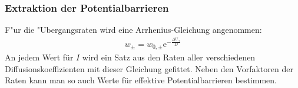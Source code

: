 \documentclass[12pt,a4paper]{article}
\begin{document}
\subsubsection{Extraktion der Potentialbarrieren}
F"ur die "Ubergangsraten wird eine Arrhenius-Gleichung angenommen:
\begin{align*}
w_{\pm}=w_{0,\pm}\text{e}^{-\frac{\Delta U_{\pm}}{D}}
\end{align*}
An jedem Wert für $I$ wird ein Satz aus den Raten aller verschiedenen Diffusionskoeffizienten mit dieser Gleichung gefittet. Neben den Vorfaktoren der Raten kann man so auch Werte für effektive Potentialbarrieren bestimmen.
\begin{figure}[H]

\end{figure}
\end{document}
